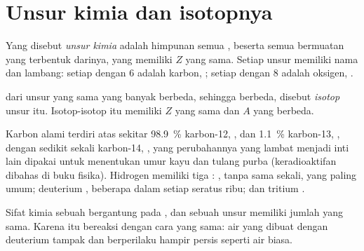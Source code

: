 \section{Unsur kimia dan isotopnya}

\begin{definition}\label{def:g9:inside-the-atom:element}
Yang disebut \emph{unsur kimia} adalah himpunan semua
, beserta semua  bermuatan yang terbentuk darinya, yang memiliki
 $Z$ yang sama. Setiap unsur memiliki nama dan lambang: setiap
 dengan 6  adalah  karbon, ; setiap  dengan 8
 adalah  oksigen, .
\end{definition}

\begin{definition}[Isotop]\label{def:g9:inside-the-atom:isotope}
 dari unsur yang sama yang banyak  berbeda, sehingga
 berbeda, disebut \emph{isotop} unsur itu.
Isotop-isotop itu memiliki $Z$ yang sama dan $A$ yang berbeda.
\end{definition}

\begin{example}\label{ex:g9:inside-the-atom:isotopes}
Karbon alami terdiri atas sekitar \qty{98.9}{\percent} karbon-12,
, dan \qty{1.1}{\percent} karbon-13, ,
dengan sedikit sekali karbon-14, , yang perubahannya
yang lambat menjadi inti lain dipakai untuk menentukan umur kayu dan
tulang purba (keradioaktifan dibahas di buku fisika). Hidrogen memiliki
tiga : , tanpa  sama sekali, yang paling
umum; deuterium , beberapa  dalam setiap seratus ribu;
dan tritium .
\end{example}

\begin{proposition}\label{prop:g9:inside-the-atom:alike}
Sifat kimia sebuah  bergantung pada , dan
 sebuah unsur memiliki jumlah  yang sama. Karena
itu  bereaksi dengan cara yang sama: air yang dibuat
dengan deuterium tampak dan berperilaku hampir persis seperti air
biasa.
\end{proposition}

